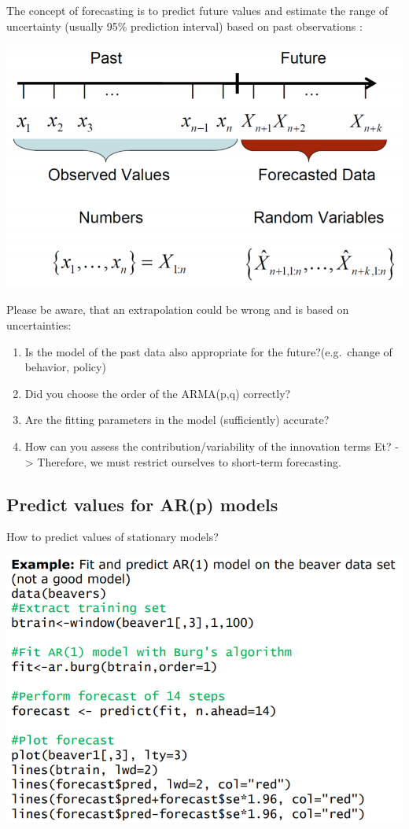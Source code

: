 \documentclass[
]{article}
\providecommand{\tightlist}{%
  \setlength{\itemsep}{0pt}\setlength{\parskip}{0pt}}
\begin{document}
The concept of forecasting is to predict future values and estimate the
range of uncertainty (usually 95\% prediction interval) based on past
observations :

\includegraphics[width=1\linewidth]{fore}

Please be aware, that an extrapolation could be wrong and is based on
uncertainties:

\begin{enumerate}
\def\labelenumi{\arabic{enumi}.}
\tightlist
\item
  Is the model of the past data also appropriate for the
  future?(e.g.~change of behavior, policy)
\item
  Did you choose the order of the ARMA(p,q) correctly?
\item
  Are the fitting parameters in the model (sufficiently) accurate?
\item
  How can you assess the contribution/variability of the innovation
  terms Et? -\textgreater{} Therefore, we must restrict ourselves to
  short-term forecasting.
\end{enumerate}

\hypertarget{predict-values-for-arp-models}{%
\subsection{Predict values for AR(p)
models}\label{predict-values-for-arp-models}}

How to predict values of stationary models?

\includegraphics[width=1\linewidth]{predict}
\end{document}
